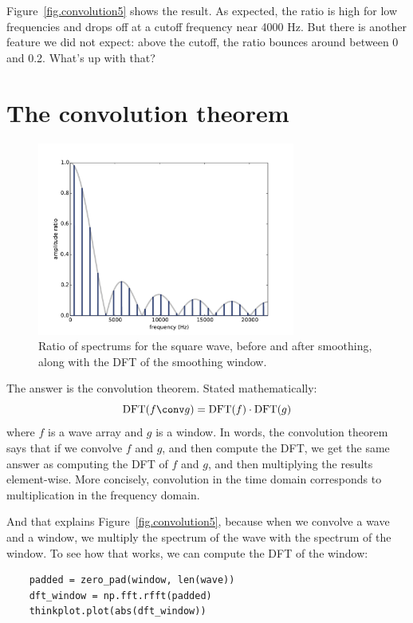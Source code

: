 \documentclass[12pt]{book}
\begin{document}
Figure~\ref{fig.convolution5} shows the result.  As expected, the
ratio is high for low frequencies and drops off at a cutoff frequency
near 4000 Hz.  But there is another feature we did not expect: above
the cutoff, the ratio bounces around between 0 and 0.2.
What's up with that?


\section{The convolution theorem}
\label{convtheorem}

\begin{figure}
\centerline{\includegraphics[height=2.5in]{figs/convolution6.pdf}}
\caption{Ratio of spectrums for the square wave, before and after
  smoothing, along with the DFT of the smoothing window.}
\label{fig.convolution6}
\end{figure}

\newcommand{\DFT}{\mathrm{DFT}}
\newcommand{\IDFT}{\mathrm{IDFT}}

The answer is the convolution theorem.  Stated mathematically:
%
\[ \DFT(f \conv g) = \DFT(f) \cdot \DFT(g) \]
%
where $f$ is a wave array and $g$ is a window.  In words,
the convolution theorem says that if we convolve $f$ and $g$,
and then compute the DFT, we get the same answer as computing
the DFT of $f$ and $g$, and then multiplying the results
element-wise.  More concisely, convolution in the time
domain corresponds to multiplication in the frequency domain.

And that explains Figure~\ref{fig.convolution5}, because when we
convolve a wave and a window, we multiply the spectrum of
the wave with the spectrum of the window.  To see how that works,
we can compute the DFT of the window:

\begin{verbatim}
    padded = zero_pad(window, len(wave))
    dft_window = np.fft.rfft(padded)
    thinkplot.plot(abs(dft_window))
\end{verbatim}
\end{document}
